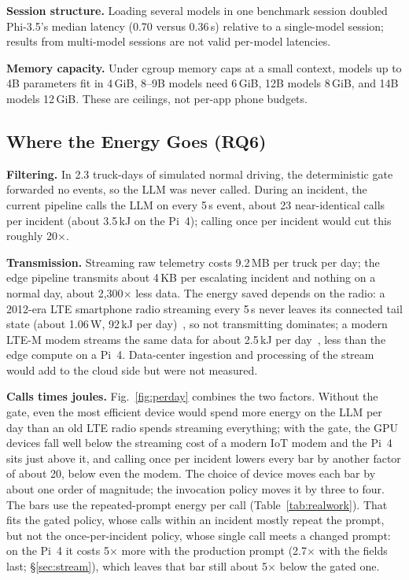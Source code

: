 \documentclass[conference]{IEEEtran}
\begin{document}
\textbf{Session structure.} Loading several models in one benchmark session doubled Phi-3.5's median latency (0.70 versus 0.36\,s) relative to a single-model session; results from multi-model sessions are not valid per-model latencies.

\textbf{Memory capacity.} Under cgroup memory caps at a small context, models up to 4B parameters fit in 4\,GiB, 8--9B models need 6\,GiB, 12B models 8\,GiB, and 14B models 12\,GiB. These are ceilings, not per-app phone budgets.

\subsection{Where the Energy Goes (RQ6)}
\label{sec:system}

\textbf{Filtering.} In 2.3 truck-days of simulated normal driving, the deterministic gate forwarded no events, so the LLM was never called. During an incident, the current pipeline calls the LLM on every 5\,s event, about 23 near-identical calls per incident (about 3.5\,kJ on the Pi~4); calling once per incident would cut this roughly 20$\times$.

\textbf{Transmission.} Streaming raw telemetry costs 9.2\,MB per truck per day; the edge pipeline transmits about 4\,KB per escalating incident and nothing on a normal day, about 2,300$\times$ less data. The energy saved depends on the radio: a 2012-era LTE smartphone radio streaming every 5\,s never leaves its connected tail state (about 1.06\,W, 92\,kJ per day)~\cite{huang2012lte}, so not transmitting dominates; a modern LTE-M modem streams the same data for about 2.5\,kJ per day~\cite{nepal2026ltem}, less than the edge compute on a Pi~4. Data-center ingestion and processing of the stream would add to the cloud side but were not measured.

\textbf{Calls times joules.} Fig.~\ref{fig:perday} combines the two factors. Without the gate, even the most efficient device would spend more energy on the LLM per day than an old LTE radio spends streaming everything; with the gate, the GPU devices fall well below the streaming cost of a modern IoT modem and the Pi~4 sits just above it, and calling once per incident lowers every bar by another factor of about 20, below even the modem. The choice of device moves each bar by about one order of magnitude; the invocation policy moves it by three to four. The bars use the repeated-prompt energy per call (Table~\ref{tab:realwork}). That fits the gated policy, whose calls within an incident mostly repeat the prompt, but not the once-per-incident policy, whose single call meets a changed prompt: on the Pi~4 it costs 5$\times$ more with the production prompt (2.7$\times$ with the fields last; \S\ref{sec:stream}), which leaves that bar still about 5$\times$ below the gated one.
\end{document}
